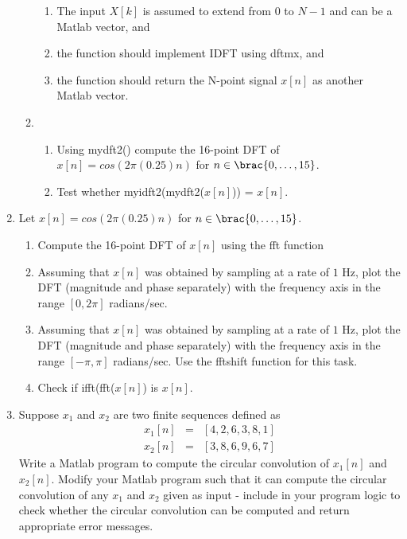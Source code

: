 \begin{enumerate}
\begin{enumerate}
    \begin{enumerate}
    \item The input $X[k]$ is assumed to extend from $0$ to $N - 1$ and can be a Matlab vector, and 
    \item the function should implement IDFT using dftmx, and 
    \item the function should return the N-point signal $x[n]$ as another Matlab vector.
    \end{enumerate}
      \item 
    \begin{enumerate}
    \item Using mydft2() compute the 16-point DFT of $x[n] = cos(2\pi (0.25)n)$ for $n \in \brac{0, \dots, 15}$.
    \item Test whether myidft2(mydft2($x[n]$)) = $x[n]$.
    \end{enumerate}
  \end{enumerate}
\item Let $x[n] = cos(2\pi (0.25)n)$ for $n \in \brac{0, \dots, 15}$.
  \begin{enumerate}
  \item Compute the 16-point DFT of $x[n]$ using the fft function
  \item Assuming that $x[n]$ was obtained by sampling at a rate of $1$ Hz, plot the DFT (magnitude and phase separately) with the frequency axis in the range $[0, 2\pi]$ radians/sec.
  \item Assuming that $x[n]$ was obtained by sampling at a rate of $1$ Hz, plot the DFT (magnitude and phase separately) with the frequency axis in the range $[-\pi, \pi]$ radians/sec. Use the fftshift function for this task.
  \item Check if ifft(fft($x[n]$) is $x[n]$.
  \end{enumerate}
\item Suppose $x_{1}$ and $x_{2}$ are two finite sequences defined as
  \begin{eqnarray*}
    x_{1}[n] & = & [4,2,6,3,8,1] \\
    x_{2}[n] & = & [3,8,6,9,6,7]
  \end{eqnarray*}
  Write a Matlab program to compute the circular convolution of $x_{1}[n]$ and $x_{2}[n]$.
  Modify your Matlab program such that it can compute the circular convolution of any $x_{1}$ and $x_{2}$ given as input - include in your program logic to check whether the circular convolution can be computed and return appropriate error messages.


\end{enumerate}
